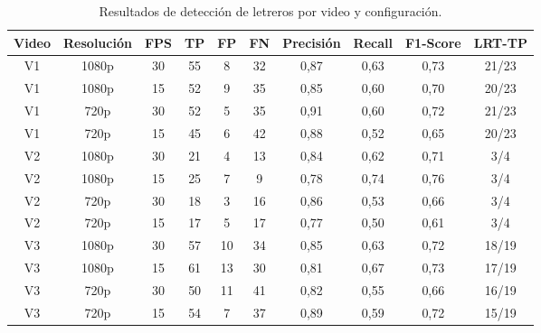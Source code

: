 \documentclass[runningheads]{llncs}
\begin{document}
\begin{table}[H]
\centering
\caption{Resultados de detección de letreros por video y configuración.}
\begin{tabular}{|c|c|c|c|c|c|c|c|c|c|}
\hline
\rowcolor{gray!20}
\textbf{Video} & \textbf{Resolución} & \textbf{FPS} & \textbf{TP} & \textbf{FP} & \textbf{FN} & \textbf{Precisión} & \textbf{Recall} & \textbf{F1-Score} & \textbf{LRT-TP} \\
\hline
V1 & 1080p & 30 & 55 & 8 & 32 & 0,87 & 0,63 & 0,73 & 21/23\\
\hline
V1 & 1080p & 15 & 52 & 9 & 35 & 0,85 & 0,60 & 0,70 & 20/23\\
\hline
V1 & 720p  & 30 & 52 & 5 & 35 & 0,91 & 0,60 & 0,72 & 21/23\\
\hline
V1 & 720p  & 15 & 45 & 6 & 42 & 0,88 & 0,52 & 0,65 & 20/23\\
\hline
V2 & 1080p & 30 & 21 & 4 & 13 & 0,84 & 0,62 & 0,71 & 3/4\\
\hline
V2 & 1080p & 15 & 25 & 7 & 9 & 0,78 & 0,74 & 0,76 & 3/4\\
\hline
V2 & 720p  & 30 & 18 & 3 & 16 & 0,86 & 0,53 & 0,66 & 3/4\\
\hline
V2 & 720p  & 15 & 17 & 5 & 17 & 0,77 & 0,50 & 0,61 & 3/4\\
\hline
V3 & 1080p & 30 & 57 & 10 & 34 & 0,85 & 0,63 & 0,72 & 18/19\\
\hline
V3 & 1080p & 15 & 61 & 13 & 30 & 0,81 & 0,67 & 0,73 & 17/19\\
\hline
V3 & 720p  & 30 & 50 & 11 & 41 & 0,82 & 0,55 & 0,66 & 16/19\\
\hline
V3 & 720p  & 15 & 54 & 7 & 37 & 0,89 & 0,59 & 0,72 & 15/19\\
\hline
\end{tabular}
\label{tab:deteccion}
\end{table}
\end{document}
